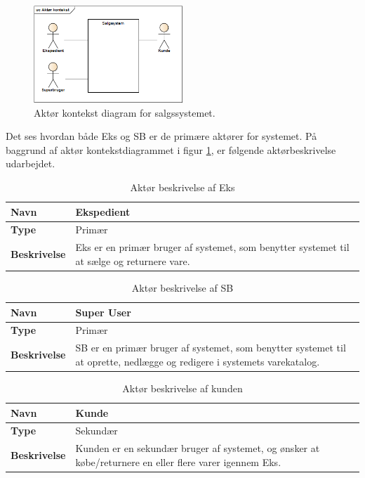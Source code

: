 \begin{figure}[htb]
    \centering
    \includegraphics[width=0.5\textwidth]{Kravspecifikation/Billeder/Aktorcont.PNG}
    \caption{Aktør kontekst diagram for salgssystemet.}
    \label{fig:aktcont}
\end{figure}

Det ses hvordan både \gls{Eks} og \gls{SB} er de primære aktører for systemet.
På baggrund af aktør kontekstdiagrammet i figur \ref{fig:aktcont}, er følgende aktørbeskrivelse udarbejdet.


\begin{table}[H]
    \begin{tabularx}{\textwidth}{|l|X|}
\hline
	\textbf{Navn} & Ekspedient \\
\hline
 	\textbf{Type} & Primær \\
\hline
	\textbf{Beskrivelse} & \gls{Eks} er en primær bruger af systemet, som benytter systemet til at sælge og returnere vare. \\
\hline
\end{tabularx}
\captionsetup{justification=raggedright,singlelinecheck=false}
\caption{Aktør beskrivelse af \gls{Eks}}
\label{tab:AktEks}
\end{table}

\begin{table}[H]
    \begin{tabularx}{\textwidth}{|l|X|}
\hline
	\textbf{Navn} & Super User \\
\hline
 	\textbf{Type} & Primær \\
\hline
	\textbf{Beskrivelse} & \gls{SB} er en primær bruger af systemet, som benytter systemet til at oprette, nedlægge og redigere i systemets varekatalog. \\
\hline
\end{tabularx}
\captionsetup{justification=raggedright,singlelinecheck=false}
\caption{Aktør beskrivelse af \gls{SB}}
\label{tab:AktSuu}
\end{table}

\begin{table}[H]
    \begin{tabularx}{\textwidth}{|l|X|}
\hline
	\textbf{Navn} & Kunde \\
\hline
 	\textbf{Type} & Sekundær \\
\hline
	\textbf{Beskrivelse} & Kunden er en sekundær bruger af systemet, og ønsker at købe/returnere en eller flere varer igennem \gls{Eks}.   \\
\hline
\end{tabularx}
\captionsetup{justification=raggedright,singlelinecheck=false}
\caption{Aktør beskrivelse af kunden}
\label{tab:AktKu}
\end{table}


\newpage
